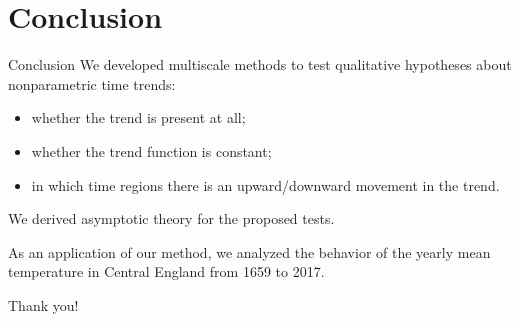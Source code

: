 \documentclass[10pt]{beamer}
\begin{document}
\section{Conclusion}
\begin{frame}{Conclusion}
We developed multiscale methods to test qualitative hypotheses about nonparametric time trends:
\begin{itemize}
\item whether the trend is present at all;
\item whether the trend function is constant;
\item in which time regions there is an upward/downward movement in the trend.
\end{itemize}
We derived asymptotic theory for the proposed tests.

As an application of our method, we analyzed the behavior of the yearly mean temperature in Central England from 1659 to 2017.
\end{frame}


\begin{frame}[standout]
  Thank you!
\end{frame}




\appendix

%
%
%
%
\end{document}
